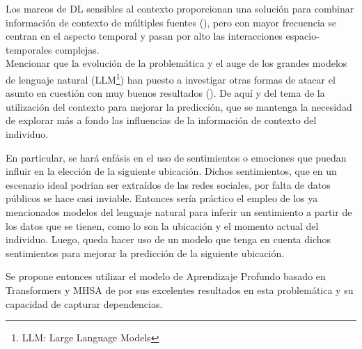 Los marcos de DL sensibles al contexto proporcionan 
una solución para combinar información de contexto de múltiples fuentes 
(\cite{sun2022tcsanet}), pero con mayor frecuencia se centran en el aspecto 
temporal y pasan por alto las interacciones espacio-temporales complejas.\\

Mencionar que la evoluci\'on de la problem\'atica y el auge de los grandes modelos de lenguaje natural (LLM\footnote{LLM: Large Language Models})
han puesto a investigar otras formas de atacar el asunto en cuesti\'on con muy buenos resultados (\cite{wang2024inextlargelanguage}).
De aqu\'i y del tema de la utilizaci\'on del contexto para mejorar la predicci\'on, que se mantenga la necesidad de explorar
m\'as a fondo las influencias de la informaci\'on de contexto del individuo. 

En particular, se har\'a
enf\'asis en el uso de sentimientos
o emociones que puedan influir en la elecci\'on de la siguiente ubicaci\'on. 
Dichos sentimientos, que en un escenario ideal podr\'ian ser extra\'idos de las redes sociales, 
por falta de datos p\'ublicos se hace casi inviable. Entonces ser\'ia pr\'actico el empleo de los ya 
mencionados modelos del lenguaje natural para inferir un sentimiento 
a partir de los datos que se tienen, como lo son la ubicaci\'on y el momento actual del individuo.
Luego, queda hacer uso de un modelo que 
tenga en cuenta dichos sentimientos para mejorar la predicci\'on de la siguiente ubicaci\'on.

Se propone entonces utilizar el modelo de Aprendizaje Profundo basado en Transformers y MHSA de \cite{Hong_2023} 
por sus excelentes resultados en esta problem\'atica y su capacidad 
de capturar dependencias.
